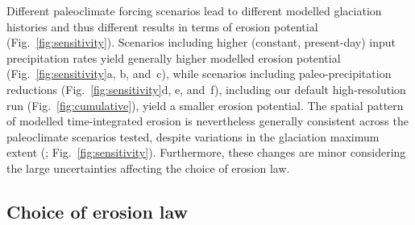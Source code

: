 \documentclass[esurf, manuscript]{copernicus}
\begin{document}
    Different paleoclimate forcing scenarios lead to different modelled
    glaciation histories \citep[cf.][]{Seguinot.etal.2018} and thus different
    results in terms of erosion
    potential (Fig.~\ref{fig:sensitivity}). Scenarios including higher
    (constant, present-day) input precipitation rates yield generally higher
    modelled
    erosion potential (Fig.~\ref{fig:sensitivity}a, b, and~c), while scenarios
    including paleo-precipitation reductions (Fig.~\ref{fig:sensitivity}d, e,
    and~f), including our default high-resolution run
    (Fig.~\ref{fig:cumulative}), yield a smaller erosion potential. The spatial
    pattern of modelled time-integrated erosion is nevertheless generally
    consistent across the paleoclimate scenarios tested,
    despite variations in the glaciation maximum extent
    (\citealp[Fig.~3 in][]{Seguinot.etal.2018}; Fig.~\ref{fig:sensitivity}).
    Furthermore, these changes are minor
    considering the large uncertainties affecting the choice of erosion law.

\subsection{Choice of erosion law}
\label{sec:powerlaws}
\end{document}
